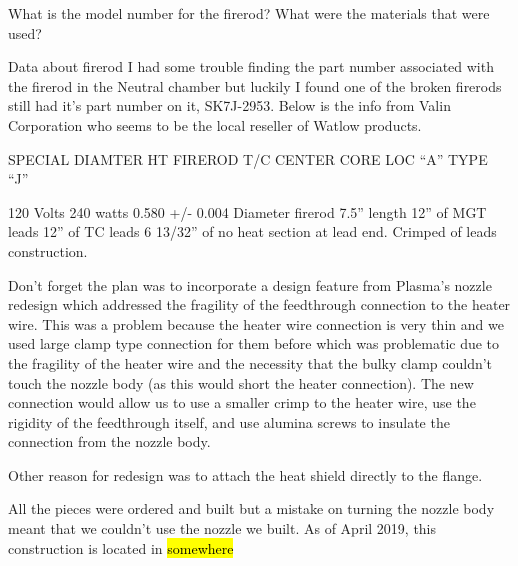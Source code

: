 What is the model number for the firerod? What were the materials that were used? 


Data about firerod
I had some trouble finding the part number associated with the firerod in the Neutral chamber but luckily I found one of the broken firerods still had it's part number on it, SK7J-2953. 
Below is the info from Valin Corporation who seems to be the local reseller of Watlow products.

SPECIAL DIAMTER
HT FIREROD   
T/C CENTER CORE LOC “A” TYPE “J”
 
120 Volts
240 watts
0.580 +/- 0.004 Diameter firerod
7.5” length
12” of MGT leads
12” of TC leads
6 13/32” of no heat section at lead end.
Crimped of leads construction.

Don't forget the plan was to incorporate a design feature from Plasma's nozzle redesign which addressed the fragility of the feedthrough connection to the heater wire. This was a problem because the heater wire connection is very thin and we used large clamp type connection for them before which was problematic due to the fragility of the heater wire and the necessity that the bulky clamp couldn't touch the nozzle body (as this would short the heater connection). The new connection would allow us to use a smaller crimp to the heater wire, use the rigidity of the feedthrough itself, and use alumina screws to insulate the connection from the nozzle body.

Other reason for redesign was to attach the heat shield directly to the flange.

All the pieces were ordered and built but a mistake on turning the nozzle body meant that we couldn't use the nozzle we built. As of April 2019, this construction is located in \hl{somewhere}